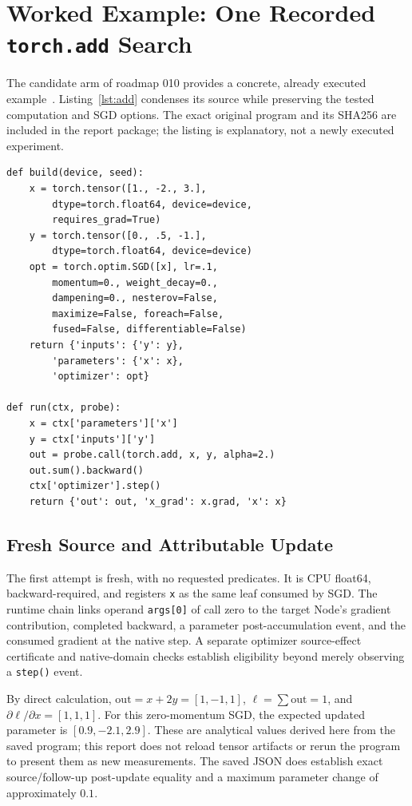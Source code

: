 \documentclass[conference]{IEEEtran}
\begin{document}
\section{Worked Example: One Recorded \texttt{torch.add} Search}
The candidate arm of roadmap 010 provides a concrete, already executed example~\cite{addcase}. Listing~\ref{lst:add} condenses its source while preserving the tested computation and SGD options. The exact original program and its SHA256 are included in the report package; the listing is explanatory, not a newly executed experiment.
\begin{lstlisting}[float=t,caption={Condensed stateful source from the recorded add search. The full source explicitly disables unsupported SGD modes.},label={lst:add}]
def build(device, seed):
    x = torch.tensor([1., -2., 3.],
        dtype=torch.float64, device=device,
        requires_grad=True)
    y = torch.tensor([0., .5, -1.],
        dtype=torch.float64, device=device)
    opt = torch.optim.SGD([x], lr=.1,
        momentum=0., weight_decay=0.,
        dampening=0., nesterov=False,
        maximize=False, foreach=False,
        fused=False, differentiable=False)
    return {'inputs': {'y': y},
        'parameters': {'x': x},
        'optimizer': opt}

def run(ctx, probe):
    x = ctx['parameters']['x']
    y = ctx['inputs']['y']
    out = probe.call(torch.add, x, y, alpha=2.)
    out.sum().backward()
    ctx['optimizer'].step()
    return {'out': out, 'x_grad': x.grad, 'x': x}
\end{lstlisting}

\subsection{Fresh Source and Attributable Update}
The first attempt is fresh, with no requested predicates. It is CPU float64, backward-required, and registers \texttt{x} as the same leaf consumed by SGD. The runtime chain links operand \texttt{args[0]} of call zero to the target Node's gradient contribution, completed backward, a parameter post-accumulation event, and the consumed gradient at the native step. A separate optimizer source-effect certificate and native-domain checks establish eligibility beyond merely observing a \texttt{step()} event.

By direct calculation, $\mathrm{out}=x+2y=[1,-1,1]$, $\ell=\sum\mathrm{out}=1$, and $\partial\ell/\partial x=[1,1,1]$. For this zero-momentum SGD, the expected updated parameter is $[0.9,-2.1,2.9]$. These are analytical values derived here from the saved program; this report does not reload tensor artifacts or rerun the program to present them as new measurements. The saved JSON does establish exact source/follow-up post-update equality and a maximum parameter change of approximately $0.1$.
\end{document}

